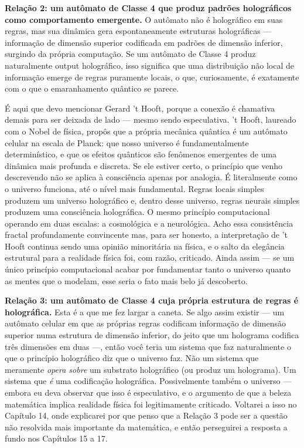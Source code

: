 \documentclass[11pt, twoside, openright]{book}
\begin{document}
\textbf{Relação 2: um autômato de Classe 4 que produz padrões holográficos como comportamento emergente.} O autômato não é holográfico em suas regras, mas sua dinâmica gera espontaneamente estruturas holográficas --- informação de dimensão superior codificada em padrões de dimensão inferior, surgindo da própria computação. Se um autômato de Classe 4 produz naturalmente output holográfico, isso significa que uma distribuição não local de informação emerge de regras puramente locais, o que, curiosamente, é exatamente com o que o emaranhamento quântico se parece.

É aqui que devo mencionar Gerard 't Hooft, porque a conexão é chamativa demais para ser deixada de lado --- mesmo sendo especulativa. 't Hooft, laureado com o Nobel de física, propôs que a própria mecânica quântica é um autômato celular na escala de Planck: que nosso universo é fundamentalmente determinístico, e que os efeitos quânticos são fenômenos emergentes de uma dinâmica mais profunda e discreta. Se ele estiver certo, o princípio que venho descrevendo não se aplica à consciência apenas por analogia. É literalmente como o universo funciona, até o nível mais fundamental. Regras locais simples produzem um universo holográfico e, dentro desse universo, regras neurais simples produzem uma consciência holográfica. O mesmo princípio computacional operando em duas escalas: a cosmológica e a neurológica. Acho essa consistência fractal profundamente convincente mas, para ser honesto, a interpretação de 't Hooft continua sendo uma opinião minoritária na física, e o salto da elegância estrutural para a realidade física foi, com razão, criticado. Ainda assim --- se um único princípio computacional acabar por fundamentar tanto o universo quanto as mentes que o modelam, esse seria o fato mais belo já descoberto.

\textbf{Relação 3: um autômato de Classe 4 cuja própria estrutura de regras é holográfica.} Esta é a que me fez largar a caneta. Se algo assim existir --- um autômato celular em que as próprias regras codificam informação de dimensão superior numa estrutura de dimensão inferior, do jeito que um holograma codifica três dimensões em duas ---, então você teria um sistema que faz naturalmente o que o princípio holográfico diz que o universo faz. Não um sistema que meramente \textit{opera sobre} um substrato holográfico (ou produz um holograma). Um sistema que \textit{é} uma codificação holográfica. Possivelmente também o universo --- embora eu deva observar que isso é especulativo, e o argumento de que a beleza matemática implica realidade física foi legitimamente criticado. Voltarei a isso no Capítulo 14, onde explicarei por que penso que a Relação 3 pode ser a questão não resolvida mais importante da matemática, e então perseguirei a resposta a fundo nos Capítulos 15 a 17.
\end{document}
